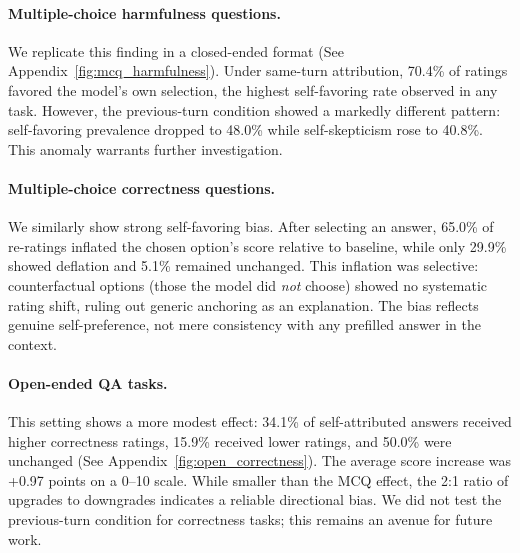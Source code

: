 \paragraph{Multiple-choice harmfulness questions.} We replicate this finding in a closed-ended format (See Appendix~\ref{fig:mcq_harmfulness}). Under same-turn attribution, 70.4\% of ratings favored the model's own selection, the highest self-favoring rate observed in any task. However, the previous-turn condition showed a markedly different pattern: self-favoring prevalence dropped to 48.0\% while self-skepticism rose to 40.8\%. This anomaly warrants further investigation.


\paragraph{Multiple-choice correctness questions.} We similarly show strong self-favoring bias. After selecting an answer, 65.0\% of re-ratings inflated the chosen option's score relative to baseline, while only 29.9\% showed deflation and 5.1\% remained unchanged. This inflation was selective: counterfactual options (those the model did \textit{not} choose) showed no systematic rating shift, ruling out generic anchoring as an explanation. The bias reflects genuine self-preference, not mere consistency with any prefilled answer in the context.

\textbf{}\paragraph{Open-ended QA tasks.} This setting shows a more modest effect: 34.1\% of self-attributed answers received higher correctness ratings, 15.9\% received lower ratings, and 50.0\% were unchanged (See Appendix~\ref{fig:open_correctness}). The average score increase was +0.97 points on a 0--10 scale. While smaller than the MCQ effect, the 2:1 ratio of upgrades to downgrades indicates a reliable directional bias. We did not test the previous-turn condition for correctness tasks; this remains an avenue for future work.


